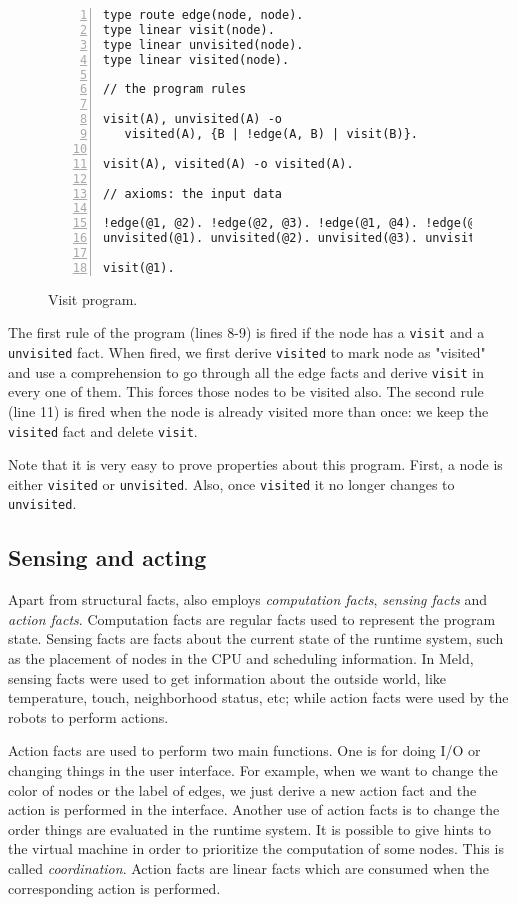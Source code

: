 \begin{figure}[h!]
\small\begin{Verbatim}[numbers=left]
type route edge(node, node).
type linear visit(node).
type linear unvisited(node).
type linear visited(node).

// the program rules

visit(A), unvisited(A) -o
   visited(A), {B | !edge(A, B) | visit(B)}.

visit(A), visited(A) -o visited(A).

// axioms: the input data

!edge(@1, @2). !edge(@2, @3). !edge(@1, @4). !edge(@2, @4).
unvisited(@1). unvisited(@2). unvisited(@3). unvisited(@4).

visit(@1).
\end{Verbatim}
  \caption{Visit program.}
  \label{code:visit}
\end{figure}
\normalsize

The first rule of the program (lines 8-9) is fired if the node has a \texttt{visit} and a \texttt{unvisited} fact. When fired, we first derive \texttt{visited} to mark node as "visited" and use a
comprehension to go through all the edge facts and derive \texttt{visit} in every one of them.
This forces those nodes to be visited also. The second rule (line 11) is fired when the node is already
visited more than once: we keep the \texttt{visited} fact and delete \texttt{visit}.

Note that it is very easy to prove properties about this program. First, a node is either
\texttt{visited} or \texttt{unvisited}. Also, once \texttt{visited} it no longer changes to
\texttt{unvisited}.

\subsection{Sensing and acting}

Apart from structural facts, \lang also employs \emph{computation facts}, \emph{sensing facts}
and \emph{action facts}.
Computation facts are regular facts used to represent the program state.
Sensing facts are facts about the current state of the runtime system, such as the placement
of nodes in the CPU and scheduling information. In Meld, sensing facts
were used to get information about the outside world, like temperature, touch, neighborhood status,
etc; while action facts were used by the robots to perform actions.

Action facts are used to perform two main functions. One is for doing I/O or changing things
in the user interface. For example, when we want to change the color of nodes or the label
of edges, we just derive a new action fact and the action is performed in the interface.
Another use of action facts is to change the order things are evaluated in the runtime system.
It is possible to give hints to the virtual machine in order to prioritize the computation of
some nodes. This is called \emph{coordination}.
Action facts are linear facts which are consumed when the corresponding action is performed.

